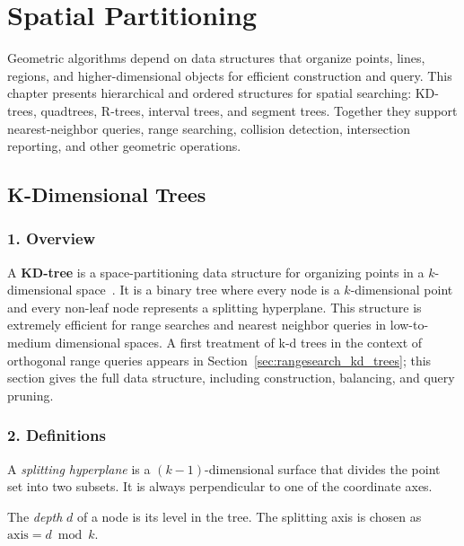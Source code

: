 \chapter{Spatial Partitioning}
\label{ch:geometric_data_structures}

Geometric algorithms depend on data structures that organize points, lines,
regions, and higher-dimensional objects for efficient construction and query.
This chapter presents hierarchical and ordered structures for spatial
searching: KD-trees, quadtrees, R-trees, interval trees, and segment trees.
Together they support nearest-neighbor queries, range searching, collision
detection, intersection reporting, and other geometric operations.
\label{ch:spatial_structures}

\section{K-Dimensional Trees}
\label{sec:kd_tree}

\subsection{1. Overview}
A \textbf{KD-tree} is a space-partitioning data structure for organizing points in a $k$-dimensional space~\cite{bentley1975}. It is a binary tree where every node is a $k$-dimensional point and every non-leaf node represents a splitting hyperplane. This structure is extremely efficient for range searches and nearest neighbor queries in low-to-medium dimensional spaces. A first treatment of k-d trees in the context of orthogonal range queries appears in Section~\ref{sec:rangesearch_kd_trees}; this section gives the full data structure, including construction, balancing, and query pruning.

\subsection{2. Definitions}
\begin{definition}
\label{def:kd_splitting_hyperplane}
A \emph{splitting hyperplane} is a $(k-1)$-dimensional surface that divides the point set into two subsets. It is always perpendicular to one of the coordinate axes.
\end{definition}

\begin{definition}[Depth]
\label{def:kd_depth}
The \emph{depth} $d$ of a node is its level in the tree. The splitting axis is chosen as $\text{axis} = d \bmod k$.
\end{definition}

